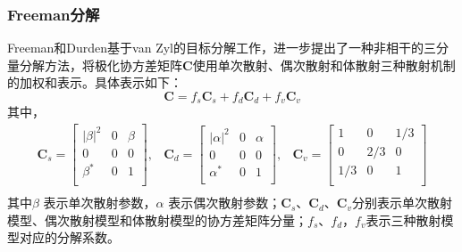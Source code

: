\subsubsection{Freeman分解}
Freeman和Durden基于van Zyl的目标分解工作，进一步提出了一种非相干的三分量分解方法，将极化协方差矩阵$\textbf{C}$使用单次散射、偶次散射和体散射三种散射机制的加权和表示。具体表示如下：
\begin{equation}
    \textbf{C}=f_s\textbf{C}_s+f_d\textbf{C}_d+f_v\textbf{C}_v
\end{equation}
其中，
\begin{equation}
    \begin{matrix}
        \textbf{C}_s=\left[ \begin{matrix}
                                    \left| \beta \right|^2 & 0 & \beta \\
                                    0                      & 0 & 0     \\
                                    \beta ^*               & 0 & 1     \\
                                \end{matrix} \right] , & \textbf{C}_d=\left[ \begin{matrix}
                                                                                 \left| \alpha \right|^2 & 0 & \alpha \\
                                                                                 0                       & 0 & 0      \\
                                                                                 \alpha ^*               & 0 & 1      \\
                                                                             \end{matrix} \right] , & \textbf{C}_v=\left[ \begin{matrix}
                                                                                                                              1   & 0   & 1/3 \\
                                                                                                                              0   & 2/3 & 0   \\
                                                                                                                              1/3 & 0   & 1   \\
                                                                                                                          \end{matrix} \right] \\
    \end{matrix}
\end{equation}
其中$\beta$ 表示单次散射参数，$\alpha$ 表示偶次散射参数；$\textbf{C}_s$、$\textbf{C}_d$、$\textbf{C}_v$分别表示单次散射模型、偶次散射模型和体散射模型的协方差矩阵分量；$f_s$、$f_d$，$f_v$表示三种散射模型对应的分解系数。

